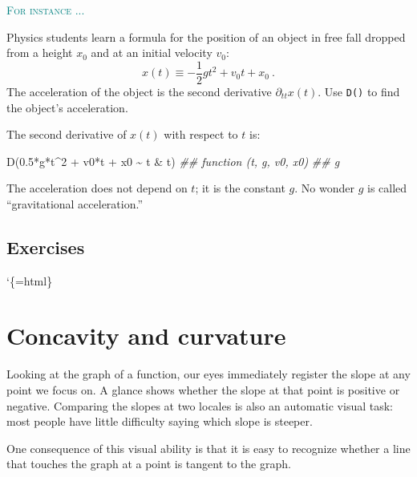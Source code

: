 \documentclass[
  letterpaper,
  DIV=11,
  numbers=noendperiod,
  oneside]{scrreprt}
\newenvironment{Shaded}{\begin{snugshade}}{\end{snugshade}}
\newcommand{\DecValTok}[1]{\textcolor[rgb]{0.68,0.00,0.00}{#1}}
\newcommand{\DocumentationTok}[1]{\textcolor[rgb]{0.37,0.37,0.37}{\textit{#1}}}
\newcommand{\FloatTok}[1]{\textcolor[rgb]{0.68,0.00,0.00}{#1}}
\newcommand{\FunctionTok}[1]{\textcolor[rgb]{0.28,0.35,0.67}{#1}}
\newcommand{\NormalTok}[1]{\textcolor[rgb]{0.00,0.46,0.62}{#1}}
\newcommand{\SpecialCharTok}[1]{\textcolor[rgb]{0.37,0.37,0.37}{#1}}
\newenvironment{example}%
{%
\textcolor{teal}{\hrulefill}%
  \par\vspace{.3\baselineskip}%
  \textcolor{teal}{\scshape For instance ...}%
  \par\vspace{\baselineskip}%
}%
{\textcolor{teal}{\hrulefill}}
\begin{document}
\begin{example}
Physics students learn a formula for the position of an object in free
fall dropped from a height \(x_0\) and at an initial velocity \(v_0\):
\[ x(t) \equiv -\frac{1}{2} g t^2 + v_0 t + x_0\ .\] The acceleration of
the object is the second derivative \(\partial_{tt} x(t)\). Use
\texttt{D()} to find the object's acceleration.

The second derivative of \(x(t)\) with respect to \(t\) is:

\begin{Shaded}
\begin{Highlighting}[]
\FunctionTok{D}\NormalTok{(}\FloatTok{0.5}\SpecialCharTok{*}\NormalTok{g}\SpecialCharTok{*}\NormalTok{t}\SpecialCharTok{\^{}}\DecValTok{2} \SpecialCharTok{+}\NormalTok{ v0}\SpecialCharTok{*}\NormalTok{t }\SpecialCharTok{+}\NormalTok{ x0 }\SpecialCharTok{\textasciitilde{}}\NormalTok{ t }\SpecialCharTok{\&}\NormalTok{ t)}
\DocumentationTok{\#\# function (t, g, v0, x0) }
\DocumentationTok{\#\# g}
\end{Highlighting}
\end{Shaded}

The acceleration does not depend on \(t\); it is the constant \(g\). No
wonder \(g\) is called ``gravitational acceleration.''

\end{example}

\hypertarget{exercises-3}{%
\section{Exercises}\label{exercises-3}}

`\{=html\}

\hypertarget{sec-concavity-curvature}{%
\chapter{Concavity and curvature}\label{sec-concavity-curvature}}

Looking at the graph of a function, our eyes immediately register the
slope at any point we focus on. A glance shows whether the slope at that
point is positive or negative. Comparing the slopes at two locales is
also an automatic visual task: most people have little difficulty saying
which slope is steeper.

One consequence of this visual ability is that it is easy to recognize
whether a line that touches the graph at a point is tangent to the
graph.
\end{document}
